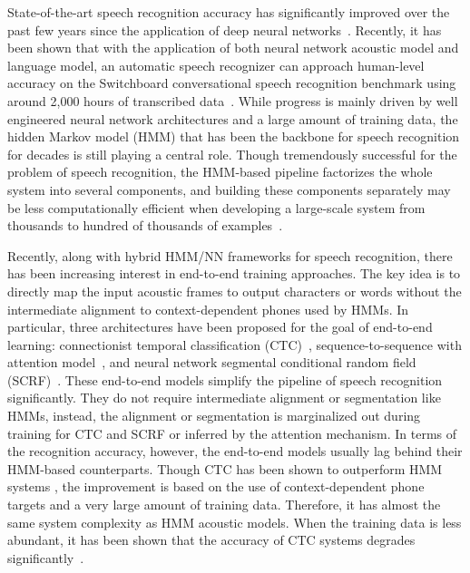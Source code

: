 \documentclass[a4paper]{article}
\begin{document}
State-of-the-art speech recognition accuracy has significantly improved over the past few years since the application of deep neural networks~\cite{hinton2012deep, seide2011conversational}. Recently, it has been shown that with the application of both neural network acoustic model and language model, an automatic speech recognizer can approach  human-level accuracy on the Switchboard conversational speech recognition benchmark using around 2,000 hours of transcribed data~\cite{xiong2016}. While progress is mainly driven by well engineered neural network architectures and a large amount of training data, the hidden Markov model (HMM) that has been the backbone for speech recognition for decades is still playing a central role. Though tremendously successful for the problem of speech recognition, the HMM-based pipeline factorizes the whole system into several components, and building these components separately may be less computationally efficient when developing a large-scale system from thousands to hundred of thousands of examples~\cite{soltau2016neural}.

Recently, along with hybrid HMM/NN frameworks for speech recognition, there has been  increasing interest in end-to-end training approaches. The key idea is to directly map the input acoustic frames to output characters or words without the intermediate alignment to context-dependent phones used by HMMs. In particular, three architectures have been proposed for the goal of end-to-end learning:  connectionist temporal classification (CTC)~\cite{graves2014towards, Hannun2014Deep, sak2015learning, miao2015eesen}, sequence-to-sequence with attention model~\cite{chorowski2015attention, lu2015study, chan2016listen}, and neural network segmental conditional random field (SCRF)~\cite{abdel2013deep, lu2016segmental}. These end-to-end models simplify the pipeline of speech recognition significantly. They do not require intermediate alignment or segmentation like HMMs, instead, the alignment or segmentation is marginalized out during training for CTC and SCRF or inferred by the attention mechanism. In terms of the recognition accuracy, however, the end-to-end models usually lag behind their HMM-based counterparts. Though CTC has been shown to outperform HMM systems \cite{sak2015fast}, the improvement is based on the use of context-dependent phone targets and a very large amount of training data. Therefore, it has almost the same system complexity as HMM acoustic models. When the training data is less abundant, it has been shown that the accuracy of CTC systems degrades significantly~\cite{pundak2016lower}. 
\end{document}
